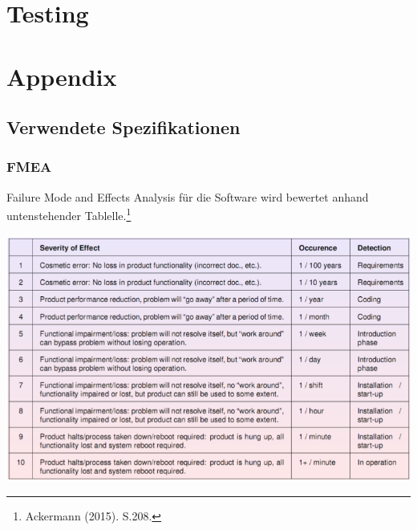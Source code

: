\documentclass[a4paper]{scrreprt}
\begin{document}
\chapter{Testing}



\chapter{Appendix}

\section{Verwendete Spezifikationen}
\subsection{FMEA}
Failure Mode and Effects Analysis für die Software wird bewertet anhand untenstehender Tablelle.\footnote{Ackermann (2015). S.208.}

\includegraphics[width=1\textwidth]{img/fmea.png}


\pagebreak
\end{document}
